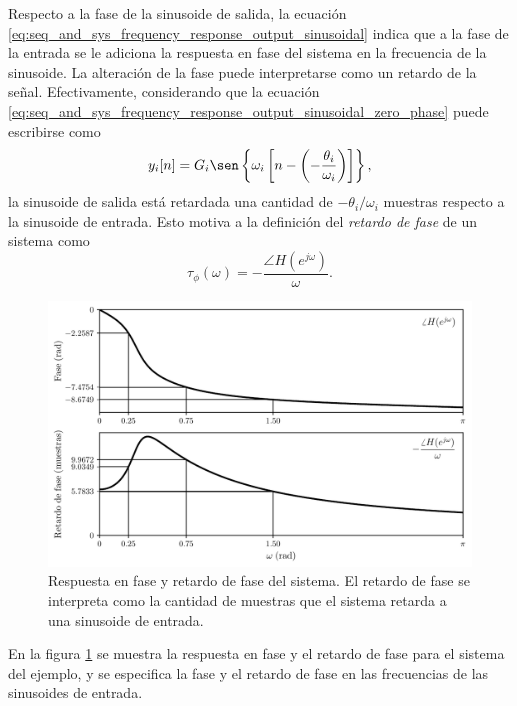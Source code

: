 \documentclass[a4paper]{report}
\begin{document}
Respecto a la fase de la sinusoide de salida, la ecuación \ref{eq:seq_and_sys_frequency_response_output_sinusoidal} indica que a la fase de la entrada se le adiciona la respuesta en fase del sistema en la frecuencia de la sinusoide. La alteración de la fase puede interpretarse como un retardo de la señal. Efectivamente, considerando que la ecuación \ref{eq:seq_and_sys_frequency_response_output_sinusoidal_zero_phase} puede escribirse como 
\[
 y_i[n]=G_i\sen\left\{\omega_i\left[n-\left(-\dfrac{\theta_i}{\omega_i}\right)\right]\right\}, 
\]
la sinusoide de salida está retardada una cantidad de \(-\theta_i/\omega_i\) muestras respecto a la sinusoide de entrada. Esto motiva a la definición del \emph{retardo de fase} de un sistema como
\begin{equation}\label{eq:seq_and_sys_phase_delay_definition}
 \tau_\phi(\omega)=-\frac{\angle H(e^{j\omega})}{\omega}.
\end{equation}
\begin{figure}[!htb]
 \begin{center}
 \includegraphics[width=\textwidth]{figuras/seq_and_sys_frequency_response_output_phase_response.pdf}
 \caption{\label{fig:seq_and_sys_frequency_response_output_phase_response} Respuesta en fase y retardo de fase del sistema. El retardo de fase se interpreta como la cantidad de muestras que el sistema retarda a una sinusoide de entrada.}
 \end{center}
\end{figure}
En la figura \ref{fig:seq_and_sys_frequency_response_output_phase_response} se muestra la respuesta en fase y el retardo de fase para el sistema del ejemplo, y se especifica la fase y el retardo de fase en las frecuencias de las sinusoides de entrada.
\end{document}
